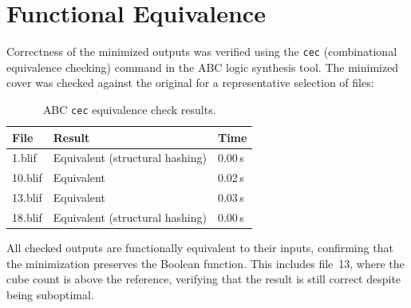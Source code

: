 \section{Functional Equivalence}

Correctness of the minimized outputs was verified using the \texttt{cec} (combinational equivalence checking) command in the ABC logic synthesis tool. The minimized cover was checked against the original for a representative selection of files:

\begin{table}[h]
\centering
\begin{tabular}{@{}lll@{}}
\toprule
File & Result & Time \\
\midrule
1.blif  & Equivalent (structural hashing) & 0.00\,s \\
10.blif & Equivalent                      & 0.02\,s \\
13.blif & Equivalent                      & 0.03\,s \\
18.blif & Equivalent (structural hashing) & 0.00\,s \\
\bottomrule
\end{tabular}
\caption{ABC \texttt{cec} equivalence check results.}
\label{tab:cec}
\end{table}

All checked outputs are functionally equivalent to their inputs, confirming that the minimization preserves the Boolean function. This includes file~13, where the cube count is above the reference, verifying that the result is still correct despite being suboptimal.